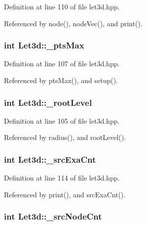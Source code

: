 Definition at line 110 of file let3d.hpp.

Referenced by node(), node\-Vec(), and print().
\subsubsection{\setlength{\rightskip}{0pt plus 5cm}int {\bf Let3d::\_\-pts\-Max}\hspace{0.3cm}{\tt  [protected]}}\label{classLet3d_9d1de62409c283894e586edb8407d985_9d1de62409c283894e586edb8407d985}




Definition at line 107 of file let3d.hpp.

Referenced by pts\-Max(), and setup().
\subsubsection{\setlength{\rightskip}{0pt plus 5cm}int {\bf Let3d::\_\-root\-Level}\hspace{0.3cm}{\tt  [protected]}}\label{classLet3d_01d82a06559beb8e8d5421992d7793ff_01d82a06559beb8e8d5421992d7793ff}




Definition at line 105 of file let3d.hpp.

Referenced by radius(), and root\-Level().
\subsubsection{\setlength{\rightskip}{0pt plus 5cm}int {\bf Let3d::\_\-src\-Exa\-Cnt}\hspace{0.3cm}{\tt  [protected]}}\label{classLet3d_e0ad31ab2e59d19a7eb3ced697a27310_e0ad31ab2e59d19a7eb3ced697a27310}




Definition at line 114 of file let3d.hpp.

Referenced by print(), and src\-Exa\-Cnt().
\subsubsection{\setlength{\rightskip}{0pt plus 5cm}int {\bf Let3d::\_\-src\-Node\-Cnt}\hspace{0.3cm}{\tt  [protected]}}\label{classLet3d_ccb6ecf39afdc22a2732de877b702836_ccb6ecf39afdc22a2732de877b702836}




